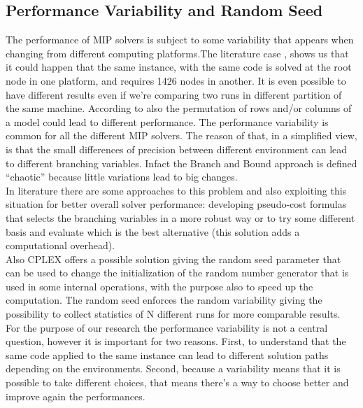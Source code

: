 \begin{appendices}
\chapter{Performance Variability and Random Seed}
The performance of MIP solvers is subject to some variability that appears when changing from different computing platforms.The literature case \cite{danna2008performance}, shows us that it could happen that the same instance, with the same code is solved at the root node in one platform, and requires 1426 nodes in another. It is even possible to have different results even if we’re comparing two runs in different partition of the same machine. According to \cite{lodi2013performance} also the permutation of rows and/or columns of a model could lead to different performance. The performance variability is common for all the different MIP solvers. 
The reason of that, in a simplified view, is that the small differences of precision between different environment can lead to different branching variables. Infact the Branch and Bound approach is defined “chaotic” because little variations lead to big changes. \\
In literature there are some approaches to this problem and also exploiting this situation for better overall solver performance: developing pseudo-cost formulas that selects the branching variables in a more robust way or to try some different basis and evaluate which is the best alternative (this solution adds a computational overhead). \\
Also CPLEX offers a possible solution giving the random seed parameter that can be used to change the initialization of the random number generator that is used in some internal operations, with the purpose also to speed up the computation. The random seed  enforces the random variability giving the possibility to collect statistics of N different runs for more comparable results. \\
For the purpose of our research the performance variability is not a central question, however it is important for two reasons. First, to understand that the same code applied to the same instance can lead to different solution paths depending on the environments. Second, because a variability means that it is possible to take different choices, that means there’s a way to choose better and improve again the performances. 














\end{appendices}



